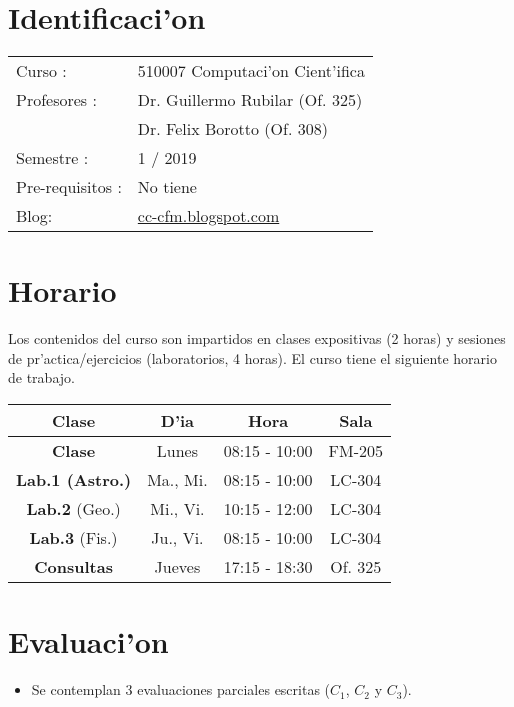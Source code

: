 \documentclass[letterpaper,11pt]{exam}
\begin{document}
\begin{multicols}{2}
\section{Identificaci'on}
\begin{center}
		\begin{tabular}{ll}
		Curso  :& 510007 Computaci'on Cient'ifica \\
		Profesores :& Dr. Guillermo Rubilar (Of. 325)\\
		& Dr. Felix Borotto (Of. 308)\\
		Semestre : & 1 / 2019 \\
		Pre-requisitos : & No tiene \\
		Blog: & \href{https://cc-cfm.blogspot.com}{cc-cfm.blogspot.com} 
		\end{tabular}
\end{center}

\section{Horario}
Los contenidos del curso son impartidos en clases expositivas (2 horas) y sesiones de pr'actica/ejercicios (laboratorios, 4 horas). El curso tiene el siguiente horario de trabajo.
\begin{center}
\begin{scriptsize}
\begin{tabular}{|cccc|}
\hline 
\textbf{Clase} & \textbf{D'ia} & \textbf{Hora} & \textbf{Sala} \\ 
\hline \textbf{Clase} & Lunes & 08:15 - 10:00  &  FM-205 \\
\hline \textbf{Lab.1 (Astro.)} & Ma., Mi. & 08:15 - 10:00  &  LC-304 \\
\hline \textbf{Lab.2} (Geo.)& Mi., Vi. & 10:15 - 12:00  &  LC-304 \\
\hline \textbf{Lab.3} (Fis.)& Ju., Vi. & 08:15 - 10:00 &  LC-304 \\
\hline \textbf{Consultas} & Jueves & 17:15 - 18:30 & Of. 325 \\
\hline 
\end{tabular} 
\end{scriptsize}
\end{center}
\section{Evaluaci'on}
\begin{itemize}
\item Se contemplan 3 evaluaciones parciales escritas ($C_1$, $C_2$ y $C_3$).  


\end{itemize}
\end{multicols}
\end{document}
